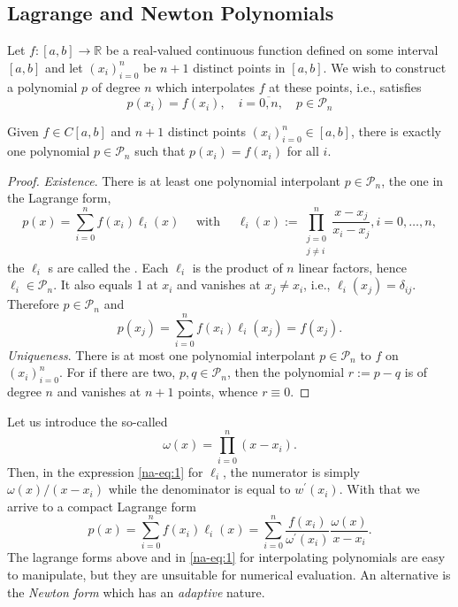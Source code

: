 \subsection{Lagrange and Newton Polynomials}

Let $f:[a, b] \rightarrow \mathbb{R}$ be a real-valued continuous function defined on some interval $[a, b]$ and let $\left(x_{i}\right)_{i=0}^{n}$ be $n+1$ distinct points in $[a, b]$. We wish to construct a polynomial $p$ of degree $n$ which interpolates $f$ at these points, i.e., satisfies
$$
p\left(x_{i}\right)=f\left(x_{i}\right), \quad i=\overline{0, n}, \quad p \in \mathcal{P}_{n}
$$

\begin{theorem}
Given $f \in C[a, b]$ and $n+1$ distinct points $\left(x_{i}\right)_{i=0}^{n} \in[a, b]$, there is exactly one polynomial $p \in \mathcal{P}_{n}$ such that $p\left(x_{i}\right)=f\left(x_{i}\right)$ for all $i$.
\end{theorem}
\begin{proof}
  \emph{Existence}. There is at least one polynomial interpolant $p \in \mathcal{P}_{n}$, the one in the Lagrange form,
  \begin{equation}\label{na-eq:1}
p(x)=\sum_{i=0}^{n} f\left(x_{i}\right) \ell_{i}(x) \quad \text { with } \quad \ell_{i}(x):=\prod_{\substack{j=0\\ j \neq i}}^{n} \frac{x-x_{j}}{x_{i}-x_{j}}, i = 0, \dots, n,\tag{$\dagger$}
  \end{equation}
the $\ell_{i}$ s are called the . Each $\ell_{i}$ is the product of $n$ linear factors, hence $\ell_{i} \in \mathcal{P}_{n}$. It also equals 1 at $x_{i}$ and vanishes at $x_{j} \neq x_{i}$, i.e., $\ell_{i}\left(x_{j}\right)=\delta_{i j}$. Therefore $p \in \mathcal{P}_{n}$ and
$$
p\left(x_{j}\right)=\sum_{i=0}^{n} f\left(x_{i}\right) \ell_{i}\left(x_{j}\right)=f\left(x_{j}\right) .
$$
\emph{Uniqueness}. There is at most one polynomial interpolant $p \in \mathcal{P}_{n}$ to $f$ on $\left(x_{i}\right)_{i=0}^{n}$. For if there are two, $p, q \in \mathcal{P}_{n}$, then the polynomial $r:=p-q$ is of degree $n$ and vanishes at $n+1$ points, whence $r \equiv 0$.
\end{proof}

Let us introduce the so-called 
$$
\omega(x)=\prod_{i=0}^{n}\left(x-x_{i}\right) .
$$
Then, in the expression \eqref{na-eq:1} for $\ell_{i}$, the numerator is simply $\omega(x) /\left(x-x_{i}\right)$ while the denominator is equal to $w^{\prime}\left(x_{i}\right)$. With that we arrive to a compact Lagrange form
$$
\boxed{
  p(x)=\sum_{i=0}^{n} f\left(x_{i}\right) \ell_{i}(x)=\sum_{i=0}^{n} \frac{f\left(x_{i}\right)}{\omega^{\prime}\left(x_{i}\right)} \frac{\omega(x)}{x-x_{i}}
}.
$$
The lagrange forms above and in \eqref{na-eq:1} for interpolating polynomials are easy to manipulate, but they are unsuitable for numerical evaluation. An alternative is the \emph{Newton form} which has an \emph{adaptive} nature.

